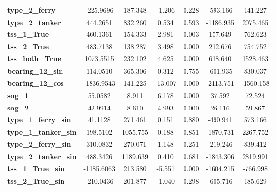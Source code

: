 \documentclass[twoside,symmetric,notoc]{tufte-book}
\begin{document}
{\begin{fullwidth}
\begin{center}
\begin{tabular}{lcccccc}
\textbf{type\_2\_ferry}       &    -225.9696  &      187.348     &    -1.206  &         0.228        &     -593.166    &      141.227     \\
\textbf{type\_2\_tanker}      &     444.2651  &      832.260     &     0.534  &         0.593        &    -1186.935    &     2075.465     \\
\textbf{tss\_1\_True}         &     460.1361  &      154.333     &     2.981  &         0.003        &      157.649    &      762.623     \\
\textbf{tss\_2\_True}         &     483.7138  &      138.287     &     3.498  &         0.000        &      212.676    &      754.752     \\
\textbf{tss\_both\_True}      &    1073.5515  &      232.102     &     4.625  &         0.000        &      618.640    &     1528.463     \\
\textbf{bearing\_12\_sin}     &     114.0510  &      365.306     &     0.312  &         0.755        &     -601.935    &      830.037     \\
\textbf{bearing\_12\_cos}     &   -1836.9543  &      141.225     &   -13.007  &         0.000        &    -2113.751    &    -1560.158     \\
\textbf{sog\_1}               &      55.0582  &        8.911     &     6.178  &         0.000        &       37.592    &       72.524     \\
\textbf{sog\_2}               &      42.9914  &        8.610     &     4.993  &         0.000        &       26.116    &       59.867     \\
\textbf{type\_1\_ferry\_sin}  &      41.1128  &      271.461     &     0.151  &         0.880        &     -490.941    &      573.166     \\
\textbf{type\_1\_tanker\_sin} &     198.5102  &     1055.755     &     0.188  &         0.851        &    -1870.731    &     2267.752     \\
\textbf{type\_2\_ferry\_sin}  &     310.0832  &      270.071     &     1.148  &         0.251        &     -219.246    &      839.412     \\
\textbf{type\_2\_tanker\_sin} &     488.3426  &     1189.639     &     0.410  &         0.681        &    -1843.306    &     2819.991     \\
\textbf{tss\_1\_True\_sin}    &   -1185.6063  &      213.580     &    -5.551  &         0.000        &    -1604.215    &     -766.998     \\
\textbf{tss\_2\_True\_sin}    &    -210.0436  &      201.877     &    -1.040  &         0.298        &     -605.716    &      185.629     \\

\end{tabular}
\end{center}
\end{fullwidth}}
\end{document}
